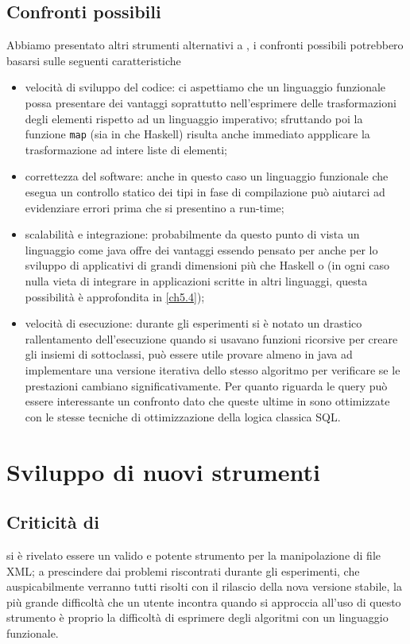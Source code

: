 \subsection{Confronti possibili}
Abbiamo presentato altri strumenti alternativi a \cduce, i confronti possibili potrebbero basarsi sulle seguenti caratteristiche
\begin{itemize}
	\item velocità di sviluppo del codice: ci aspettiamo che un linguaggio funzionale possa presentare dei vantaggi soprattutto nell'esprimere delle trasformazioni degli elementi rispetto ad un linguaggio imperativo; sfruttando poi la funzione \verb|map| (sia in \cduce che Haskell) risulta anche immediato appplicare la trasformazione ad intere liste di elementi;
	\item correttezza del software: anche in questo caso un linguaggio funzionale che esegua un controllo statico dei tipi in fase di compilazione può aiutarci ad evidenziare errori prima che si presentino a run-time;
	\item scalabilità e integrazione: probabilmente da questo punto di vista un linguaggio come java offre dei vantaggi essendo pensato per anche per lo sviluppo di applicativi di grandi dimensioni più che Haskell o \cduce (in ogni caso nulla vieta di integrare \cduce in applicazioni scritte in altri linguaggi, questa possibilità è approfondita in \ref{ch5.4});
	\item  velocità di esecuzione: durante gli esperimenti si è notato un drastico rallentamento dell'esecuzione quando si usavano funzioni ricorsive per creare gli insiemi di sottoclassi, può essere utile provare almeno in java ad implementare una versione iterativa dello stesso algoritmo per verificare se le prestazioni cambiano significativamente. Per quanto riguarda le query può essere interessante un confronto dato che queste ultime in \cduce sono ottimizzate con le stesse tecniche di ottimizzazione della logica classica SQL.
\end{itemize}
\section{Sviluppo di nuovi strumenti}
\subsection{Criticità di \cduce}
\cduce si è rivelato essere un valido e potente strumento per la manipolazione di file XML; a prescindere dai problemi riscontrati durante gli esperimenti, che auspicabilmente verranno tutti risolti con il rilascio della nova versione stabile, la più grande difficoltà che un utente incontra quando si approccia all'uso di questo strumento è proprio la difficoltà di esprimere degli algoritmi con un linguaggio funzionale.

